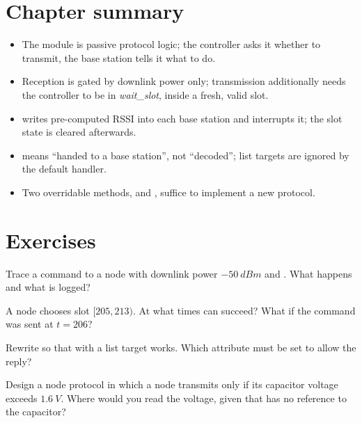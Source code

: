 \section{Chapter summary}
\begin{itemize}
 \item The module is passive protocol logic; the controller asks it whether to transmit, the base station tells it what to do.
 \item Reception is gated by downlink power only; transmission additionally needs the controller to be in \emph{wait\_slot}, inside a fresh, valid slot.
 \item {} writes pre-computed RSSI into each base station and interrupts it; the slot state is cleared afterwards.
 \item {} means ``handed to a base station'', not ``decoded''; list targets are ignored by the default handler.
 \item Two overridable methods,  and , suffice to implement a new protocol.
\end{itemize}

\section*{Exercises}
\begin{exercise}
Trace a  command to a node with downlink power $\SI{-50}{dBm}$ and . What happens and what is logged?
\end{exercise}
\begin{exercise}
A node chooses slot $[205,213)$. At what times can  succeed? What if the command was sent at $t=206$?
\end{exercise}
\begin{exercise}
Rewrite  so that  with a list target works. Which attribute must be set to allow the reply?
\end{exercise}
\begin{exercise}
Design a node protocol in which a node transmits only if its capacitor voltage exceeds $\SI{1.6}{V}$. Where would you read the voltage, given that  has no reference to the capacitor?
\end{exercise}

